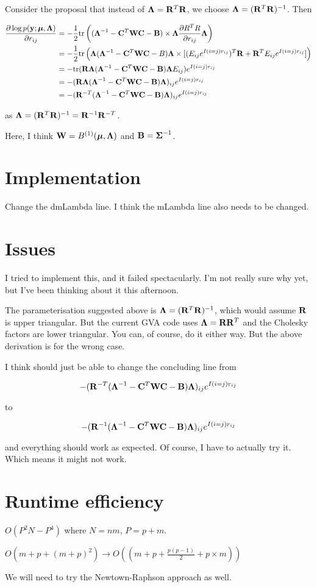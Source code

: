 \documentclass{article}[12pt]
\begin{document}
Consider the proposal that instead of ${\boldsymbol \Lambda} = {\bf R}^T {\bf R}$, we choose
${\boldsymbol \Lambda} = ({\bf R}^T {\bf R})^{-1}$. Then

\begin{align*}
\frac{\partial \log p({\bf y}; {\boldsymbol \mu}, {\boldsymbol \Lambda})}{\partial r_{ij}} &= - {\frac{1}{2}} \text{tr} \left( ({\boldsymbol \Lambda}^{-1} - {\bf C}^T {\bf W} {\bf C} - {\bf B}) \times {\boldsymbol\Lambda} \frac{\partial R^T R}{\partial r_{ij}} {\boldsymbol \Lambda} \right) \\
&= - {\frac{1}{2}} \text{tr} \left( {\boldsymbol \Lambda}({\boldsymbol \Lambda}^{-1} - {\bf C}^T{\bf W}{\bf C} - B){\boldsymbol \Lambda} \times [(E_{ij} e^{I(i=j)r_{ij}})^T {\bf R} + {\bf R}^T E_{ij} e^{I(i=j) r_{ij}}] \right) \\
&= - \text{tr} ({\bf R} {\boldsymbol \Lambda} ({\boldsymbol \Lambda}^{-1} - {\bf C}^T {\bf W} {\bf C} - {\bf B}) {\boldsymbol \Lambda} E_{ij})e^{I(i=j) r_{ij}} \\
&= - ({\bf R} {\boldsymbol \Lambda} ({\boldsymbol \Lambda}^{-1} - {\bf C}^T {\bf W} {\bf C} - {\bf B}) {\boldsymbol \Lambda})_{ij} e^{I(i=j) r_{ij}} \\
&= - ({\bf R}^{-T} ({\boldsymbol \Lambda}^{-1} - {\bf C}^T {\bf W} {\bf C} - {\bf B}) {\boldsymbol \Lambda})_{ij} e^{I(i=j) r_{ij}}
\end{align*}

as ${\boldsymbol \Lambda} = ({\bf R}^T {\bf R})^{-1} = {\bf R}^{-1} {\bf R}^{-T}$.

Here, I think ${\bf W} = B^{(1)}({\boldsymbol \mu}, {\boldsymbol \Lambda})$ and ${\bf B} = {\boldsymbol \Sigma}^{-1}$.

\section{Implementation}
Change the dmLambda line. I think the mLambda line also needs to be
changed.

\section{Issues}
I tried to implement this, and it failed spectacularly. I'm not really
sure why yet, but I've been thinking about it this afternoon.

The parameterisation suggested above is ${\boldsymbol \Lambda} = ({\bf R}^T{\bf R})^{-1}$,
which would assume ${\bf R}$ is upper triangular. But the current GVA
code uses ${\boldsymbol \Lambda} = {\bf R} {\bf R}^T$ and the Cholesky factors are lower
triangular. You can, of course, do it either way. But the above
derivation is for the wrong case.

I think should just be able to change the concluding line from

$$
- ({\bf R}^{-T} ({\boldsymbol \Lambda}^{-1} - {\bf C}^T {\bf W} {\bf C} - {\bf B}) {\boldsymbol \Lambda})_{ij} e^{I(i=j) r_{ij}}
$$

\noindent to

$$
- ({\bf R}^{-1} ({\boldsymbol \Lambda}^{-1} - {\bf C}^T {\bf W} {\bf C} - {\bf B}) {\boldsymbol \Lambda})_{ij} e^{I(i=j) r_{ij}}
$$

\noindent and everything should work as expected. Of course, I have to actually try it.
Which means it might not work.

\section{Runtime efficiency}
$O(P^2 N - P^4)$ where $N=nm$, $P=p+m$.

\noindent $O(m + p + (m+p)^2) \to O((m + p + \frac{p(p-1)}{2} + p \times m))$

\noindent We will need to try the Newtown-Raphson approach as well.
\end{document}
